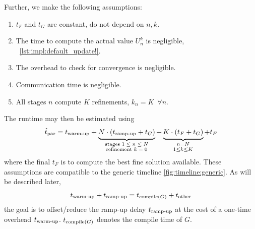 Further, we make the following assumptions:
\begin{enumerate}
  \item
    \label{item:impl:assumption:tF}
    $t_F$ and $t_G$ are constant, \ie do not depend on $n, k$.
  \item
    \label{item:impl:assumption:tU}
    The time to compute the actual value $U_n^k$ is negligible,
    \cf~\autoref{lst:impl:default_update!}.
  \item
    The overhead to check for convergence is negligible.
  \item
    Communication time is negligible.
  \item
    All stages $n$ compute $K$ refinements, \ie $k_n = K \enspace\forall n$.
\end{enumerate}
The runtime may then be estimated using
\begin{equation}
\label{eq:impl:tpar}
  \hattpar
  = \twarmup
  + \underbrace{
    \strut
    N \cdot (\trampup + t_G)
  }_{\substack{
    \text{stages $1\leq n\leq N$}\\
    \text{refinement $k=0$}
  }}
  + \underbrace{
    \strut
    K \cdot (t_F + t_G)
  }_{\substack{
    \vphantom{\text{stage}}
    n = N \\
    1 \leq k \leq K
  }}
  + t_F
\end{equation}
where the final $t_F$ is to compute the best fine solution available.
These assumptions are compatible to the generic timeline \autoref{fig:timeline:generic}.
As will be described later,
\begin{equation}
  t_\text{warm-up} + t_\text{ramp-up}
  = t_{\operatorname{compile}(G)} + t_\text{other}
\end{equation}
\ie the goal is to offset/reduce the ramp-up delay $t_\text{ramp-up}$
at the cost of a one-time overhead $t_\text{warm-up}$.
$t_{\operatorname{compile}(G)}$ denotes the compile time of $G$.

